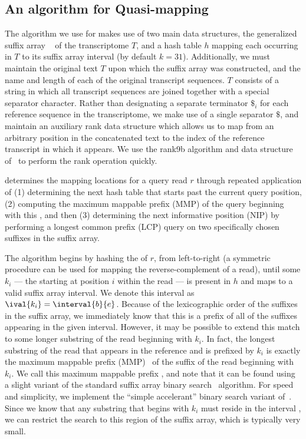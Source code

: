 \subsection{An algorithm for Quasi-mapping} \label{sec:overview} 
The algorithm we use for \qm makes use of two main data structures, the generalized suffix array
~\citep{Manber:1993:Suffix}  of the transcriptome $T$, and a hash table $h$ mapping each \kmer occurring in $T$ to its suffix array interval (by default $k = 31$).  Additionally, we must maintain the original text $T$ upon which the suffix array was constructed, and the name and length of each of the original transcript sequences.  $T$ consists of a string in which all transcript sequences are joined together with a special separator character.  Rather than designating a separate terminator $\$_{i}$ for each reference sequence in the transcriptome, we make use of a single separator $\$$, and maintain an auxiliary rank data structure which allows us to map from an arbitrary position in the concatenated text to the index of the reference transcript in which it appears.  We use the rank9b algorithm and data structure of~\citet{Vigna:2008:Broadword} to perform the rank operation quickly.

\Qm determines the mapping locations for a query read $r$ through repeated application of (1) determining the next hash table \kmer that starts past the current query position, (2) computing the maximum mappable prefix (MMP) of the query beginning with this \kmer, and then (3) determining the next informative position (NIP) by performing a longest common prefix (LCP) query on two specifically chosen suffixes in the suffix array.

The algorithm begins by hashing the \kmers of $r$, from left-to-right (a symmetric procedure can be used for mapping the reverse-complement of a read), until some \kmer $k_i$ --- the \kmer starting at position $i$ within the read --- is present in $h$ and maps to a valid suffix array interval. We denote this interval as $\ival{k_i} = \interval{b}{e}$. Because of the lexicographic order of the suffixes in the suffix array, we immediately know that this \kmer is a prefix of all of the suffixes appearing in the given interval.  However, it may be possible to extend this match to some longer substring of the read beginning with $k_i$. In fact, the longest substring of the read that appears in the reference and is prefixed by $k_i$ is exactly the maximum mappable prefix (MMP)~\citep{Dobin:2013:STAR} of the suffix of the read beginning with $k_i$.  We call this maximum mappable prefix \MMP[i], and note that it can be found using a slight variant of the standard suffix array binary search~\citep{Manber:1993:Suffix} algorithm.  For speed and simplicity, we implement the ``simple accelerant'' binary search variant of~\citet{Gusfield}.  Since we know that any substring that begins with $k_i$ must reside in the interval , we can restrict the \MMP[i] search to this region of the suffix array, which is typically very small.

